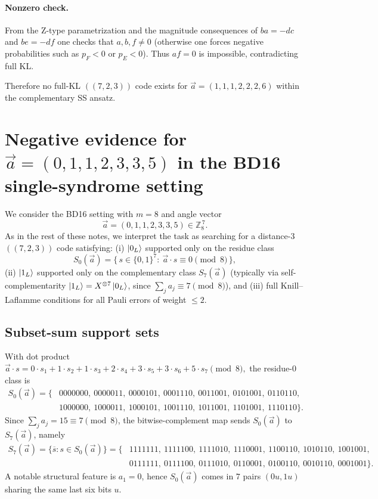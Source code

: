 \documentclass[11pt]{article}
\begin{document}
\paragraph{Nonzero check.}
From the Z-type parametrization and the magnitude consequences of $ba=-dc$ and $be=-df$ one checks
that $a,b,f\neq 0$ (otherwise one forces negative probabilities such as $p_F<0$ or $p_E<0$).
Thus $af=0$ is impossible, contradicting full KL.

Therefore no full-KL \(((7,2,3))\) code exists for $\vec a=(1,1,1,2,2,2,6)$ within the complementary SS ansatz.


\section{Negative evidence for \texorpdfstring{$\vec a=(0,1,1,2,3,3,5)$}{a=(0,1,1,2,3,3,5)} in the BD16 single-syndrome setting}

We consider the BD16 setting with \(m=8\) and angle vector
\[
\vec a=(0,1,1,2,3,3,5)\in\mathbb{Z}_8^{\,7}.
\]
As in the rest of these notes, we interpret the task as searching for a distance-\(3\) \(((7,2,3))\) code satisfying:
(i) \(\ket{0_L}\) supported only on the residue class
\[
S_0(\vec a)=\{\,s\in\{0,1\}^7:\ \vec a\cdot s \equiv 0 \pmod 8\,\},
\]
(ii) \(\ket{1_L}\) supported only on the complementary class \(S_7(\vec a)\) (typically via self-complementarity
\(\ket{1_L}=X^{\otimes 7}\ket{0_L}\), since \(\sum_j a_j\equiv 7\pmod 8\)), and
(iii) full Knill--Laflamme conditions for all Pauli errors of weight \(\le 2\).

\subsection{Subset-sum support sets}
With dot product
\(
\vec a\cdot s = 0\cdot s_1 + 1\cdot s_2 + 1\cdot s_3 + 2\cdot s_4 + 3\cdot s_5 + 3\cdot s_6 + 5\cdot s_7
\pmod 8,
\)
the residue-\(0\) class is
\[
\begin{aligned}
S_0(\vec a)=\{&
0000000,\ 0000011,\ 0000101,\ 0001110,\ 0011001,\ 0101001,\ 0110110,\\
&1000000,\ 1000011,\ 1000101,\ 1001110,\ 1011001,\ 1101001,\ 1110110
\}.
\end{aligned}
\]
Since \(\sum_j a_j=15\equiv 7\pmod 8\), the bitwise-complement map sends \(S_0(\vec a)\) to \(S_7(\vec a)\), namely
\[
\begin{aligned}
S_7(\vec a)=\{\overline{s}:s\in S_0(\vec a)\}=\{&
1111111,\ 1111100,\ 1111010,\ 1110001,\ 1100110,\ 1010110,\ 1001001,\\
&0111111,\ 0111100,\ 0111010,\ 0110001,\ 0100110,\ 0010110,\ 0001001
\}.
\end{aligned}
\]
A notable structural feature is \(a_1=0\), hence \(S_0(\vec a)\) comes in \(7\) pairs \((0u,1u)\) sharing the same last
six bits \(u\).
\end{document}
